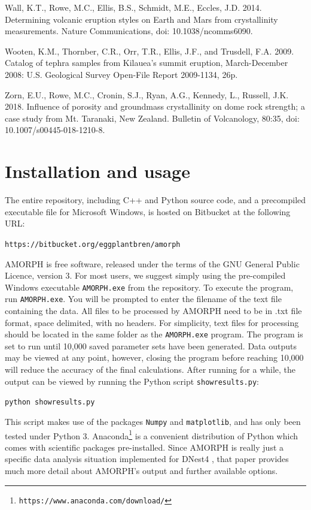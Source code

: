 \documentclass[review]{elsarticle}
\begin{document}
\begin{thebibliography}{99}
Wall, K.T., Rowe, M.C., Ellis, B.S., Schmidt, M.E., Eccles, J.D. 2014. Determining volcanic eruption styles on Earth and Mars from crystallinity measurements. Nature Communications, doi: 10.1038/ncomms6090.

Wooten, K.M., Thornber, C.R., Orr, T.R., Ellis, J.F., and Trusdell, F.A. 2009. Catalog of tephra samples from Kilauea's summit eruption, March-December 2008: U.S. Geological Survey Open-File Report 2009-1134, 26p.

Zorn, E.U., Rowe, M.C., Cronin, S.J., Ryan, A.G., Kennedy, L., Russell, J.K. 2018. Influence of porosity and groundmass crystallinity on dome rock strength; a case study from Mt. Taranaki, New Zealand. Bulletin of Volcanology, 80:35, doi: 10.1007/s00445-018-1210-8.

\end{thebibliography}

\appendix
\section{Installation and usage}\label{sec:program}

The entire repository, including C++ and Python source code, and a 
precompiled executable file for Microsoft Windows,
is hosted on Bitbucket at the following URL:

\vspace{1em}
{\tt https://bitbucket.org/eggplantbren/amorph}
\vspace{1em}

AMORPH is free software, released under the terms of the GNU General Public
Licence, version 3.
For most users, we suggest simply using the pre-compiled Windows executable
{\tt AMORPH.exe} from the repository. To execute the program,
run {\tt AMORPH.exe}. You will be prompted to enter the filename of the text
file containing the data. All files to be processed by AMORPH need to be in .txt file format, space delimited, with no headers. For simplicity, text files for processing should be located in the same folder as the {\tt AMORPH.exe} program. The program is set to run until 10,000 saved parameter sets have been generated. Data outputs may be viewed at any point, however, closing the program before reaching  10,000 will reduce the accuracy of the final calculations. After running for a while, the output can be viewed
by running the Python script {\tt showresults.py}:

\vspace{1em}
{\tt python showresults.py}
\vspace{1em}

This script makes use of the packages {\tt Numpy} and {\tt matplotlib},
and has only been tested under Python 3. Anaconda\footnote{\tt https://www.anaconda.com/download/} is a convenient distribution
of Python which comes with scientific packages pre-installed.
Since AMORPH is really just a specific data analysis situation implemented
for DNest4 \citep{dnest4}, that paper provides much more detail about
AMORPH's output and further available options.
\end{document}
